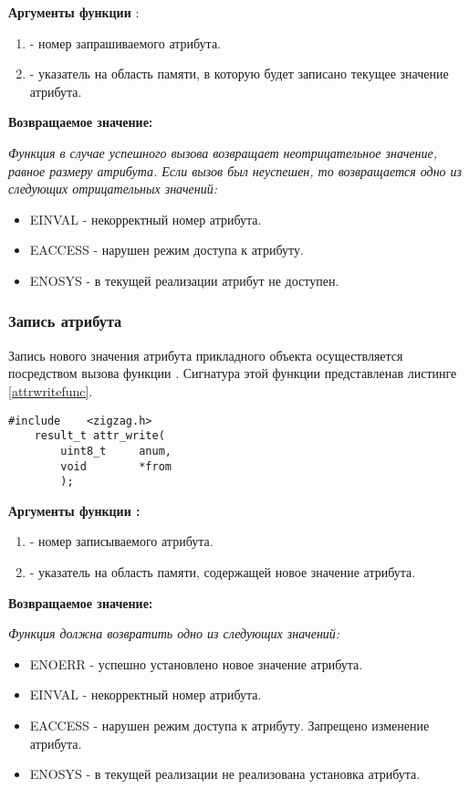 {\bfseries Аргументы функции }:

{\itshape
\begin{enumerate}
\item {} - номер запрашиваемого атрибута.
\item {} - указатель на область памяти, в которую будет записано текущее значение атрибута.
\end{enumerate}
}

{\bfseries Возвращаемое значение:}

{\itshape
Функция  в случае успешного вызова возвращает неотрицательное значение, равное
размеру атрибута. Если вызов был неуспешен, то возвращается одно из следующих отрицательных значений:
\begin{itemize}
\item EINVAL - некорректный номер атрибута.
\item EACCESS - нарушен режим доступа к атрибуту.
\item ENOSYS - в текущей реализации атрибут не доступен.
\end{itemize}
}

\subsubsection{Запись атрибута}

Запись нового значения атрибута прикладного объекта осуществляется посредством вызова функции . 
Сигнатура этой функции представленав листинге \ref{attrwritefunc}.

\begin{lstlisting}[caption=Функция \myfunc{attr\_write()} - запись атрибута. , label=attrwritefunc ]
    #include    <zigzag.h>
    result_t attr_write(
        uint8_t     anum,
        void        *from
        );
\end{lstlisting}

{\bfseries Аргументы функции :}

{\itshape
\begin{enumerate}
\item {} - номер записываемого атрибута.
\item {} - указатель на область памяти, содержащей новое значение атрибута.
\end{enumerate}
}

{\bfseries Возвращаемое значение:}

{\itshape
Функция  должна возвратить одно из следующих значений:
\begin{itemize}
\item ENOERR - успешно установлено новое значение атрибута.
\item EINVAL - некорректный номер атрибута.
\item EACCESS - нарушен режим доступа к атрибуту. Запрещено изменение атрибута.
\item ENOSYS - в текущей реализации не реализована установка атрибута.
\end{itemize}
}


